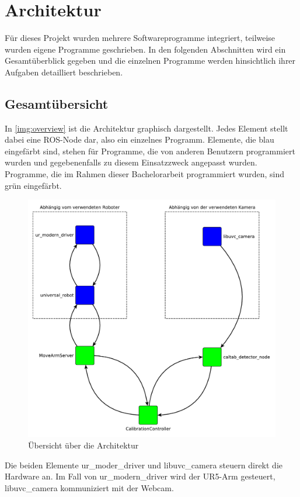 \chapter{Architektur}
Für dieses Projekt wurden mehrere Softwareprogramme integriert, teilweise wurden eigene Programme geschrieben. In den folgenden Abschnitten wird ein Gesamtüberblick gegeben und die einzelnen Programme werden hinsichtlich ihrer Aufgaben detailliert beschrieben.

\section{Gesamtübersicht} %
\label{sec:gesamtübersicht}
In \autoref{img:overview} ist die Architektur graphisch dargestellt. Jedes Element stellt dabei eine ROS-Node dar, also ein einzelnes Programm. Elemente, die blau eingefärbt sind, stehen für Programme, die von anderen Benutzern programmiert wurden und gegebenenfalls zu diesem Einsatzzweck angepasst wurden. Programme, die im Rahmen dieser Bachelorarbeit programmiert wurden, sind grün eingefärbt.

\begin{figure}[!hbt]
	\centering
	\vspace{1ex}
	\includegraphics[scale=0.6]{../images/overview}
	\caption[Übersicht über die Architektur]{\label{img:overview} Übersicht über die Architektur}
	\vspace{1ex}
\end{figure}
Die beiden Elemente ur\_moder\_driver und libuvc\_camera steuern direkt die Hardware an. Im Fall von ur\_modern\_driver wird der UR5-Arm gesteuert, libuvc\_camera kommuniziert mit der Webcam.

